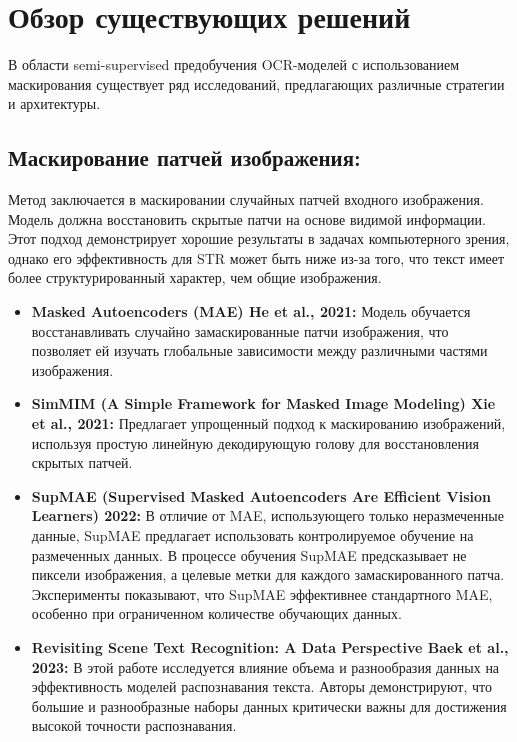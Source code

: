 \section{Обзор существующих решений}
\label{sec:Chapter2} 


В  области  semi-supervised  предобучения  OCR-моделей  с  использованием  маскирования  существует  ряд  исследований, предлагающих  различные  стратегии  и  архитектуры.

\subsection{Маскирование  патчей  изображения:}
Метод заключается в маскировании случайных патчей входного изображения.  Модель должна восстановить скрытые патчи на основе видимой информации. Этот подход демонстрирует  хорошие  результаты  в  задачах  компьютерного  зрения,  однако  его  эффективность  для  STR  может  быть  ниже  из-за  того,  что  текст  имеет  более  структурированный  характер,  чем  общие  изображения.
\begin{itemize}
    \item \textbf{Masked Autoencoders (MAE)  He et al., 2021:}  Модель  обучается  восстанавливать  случайно  замаскированные  патчи  изображения,  что  позволяет  ей  изучать  глобальные  зависимости  между  различными  частями  изображения.

    \item \textbf{SimMIM (A Simple Framework for Masked Image Modeling) Xie et al., 2021:}  Предлагает  упрощенный  подход  к  маскированию  изображений,  используя  простую  линейную  декодирующую  голову  для  восстановления  скрытых  патчей.

    \item \textbf{SupMAE (Supervised Masked Autoencoders Are Efficient Vision Learners) 2022:} В отличие от MAE, использующего только неразмеченные данные, SupMAE предлагает использовать контролируемое обучение на размеченных данных. В процессе обучения SupMAE предсказывает не пиксели изображения, а целевые метки для каждого замаскированного патча.  Эксперименты показывают, что SupMAE  эффективнее стандартного MAE, особенно при ограниченном количестве обучающих данных.
 
    \item \textbf{Revisiting Scene Text Recognition: A Data Perspective Baek et al., 2023:}  В  этой  работе  исследуется  влияние  объема  и  разнообразия  данных  на  эффективность  моделей  распознавания  текста.  Авторы  демонстрируют,  что  большие  и  разнообразные  наборы  данных  критически  важны  для  достижения  высокой  точности  распознавания.  
\end{itemize}

